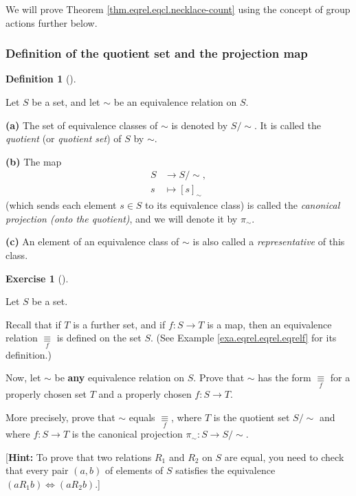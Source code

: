 \documentclass[numbers=enddot,12pt,final,onecolumn,notitlepage]{scrartcl}%
\newcounter{exer}
\numberwithin{exer}{subsection}
\theoremstyle{definition}
\newtheorem{defi}[theo]{Definition}
\newenvironment{definition}[1][]
{\begin{defi}[#1]\begin{leftbar}}
{\end{leftbar}\end{defi}}
\newtheorem{exmp}[exer]{Exercise}
\newenvironment{exercise}[1][]
{\begin{exmp}[#1]\begin{leftbar}}
{\end{leftbar}\end{exmp}}
\begin{document}
We will prove Theorem \ref{thm.eqrel.eqcl.necklace-count} using the concept of
group actions further below.

\subsubsection{Definition of the quotient set and the projection map}

\begin{definition}
\label{def.eqrel.eqcl.proj}Let $S$ be a set, and let $\sim$ be an equivalence
relation on $S$.

\textbf{(a)} The set of equivalence classes of $\sim$ is denoted by $S/\sim$.
It is called the \textit{quotient} (or \textit{quotient set}) of $S$ by $\sim$.

\textbf{(b)} The map%
\begin{align*}
S  &  \rightarrow\left.  S/\sim\right.  ,\\
s  &  \mapsto\left[  s\right]  _{\sim}%
\end{align*}
(which sends each element $s\in S$ to its equivalence class) is called the
\textit{canonical projection (onto the quotient)}, and we will denote it by
$\pi_{\sim}$.

\textbf{(c)} An element of an equivalence class of $\sim$ is also called a
\textit{representative} of this class.
\end{definition}

\begin{exercise}
\label{exe.eqrel.eqrel.=f}Let $S$ be a set.

Recall that if $T$ is a further set, and if $f:S\rightarrow T$ is a map, then
an equivalence relation $\underset{f}{\equiv}$ is defined on the set $S$. (See
Example \ref{exa.eqrel.eqrel.eqrelf} for its definition.)

Now, let $\sim$ be \textbf{any} equivalence relation on $S$. Prove that $\sim$
has the form $\underset{f}{\equiv}$ for a properly chosen set $T$ and a
properly chosen $f:S\rightarrow T$.

More precisely, prove that $\sim$ equals $\underset{f}{\equiv}$, where $T$ is
the quotient set $S/\sim$ and where $f:S\rightarrow T$ is the canonical
projection $\pi_{\sim}:S\rightarrow S/\sim$.

[\textbf{Hint:} To prove that two relations $R_{1}$ and $R_{2}$ on $S$ are
equal, you need to check that every pair $\left(  a,b\right)  $ of elements of
$S$ satisfies the equivalence $\left(  aR_{1}b\right)  \iff\left(
aR_{2}b\right)  $.]
\end{exercise}
\end{document}
